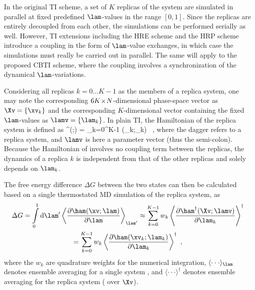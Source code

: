 In the original TI scheme\cite{KI33.1,KI34.2,KI35.1}, a set of 
$K$ replicas of the system are simulated in parallel at fixed predefined 
$\lam$-values in the range $[0,1]$.
Since the replicas are entirely decoupled 
from each other, the simulations
can be performed serially as well. However, TI extensions 
including the HRE scheme\cite{SU99.1,FU02.2,ZH16.2} and the HRP scheme\cite{IT13.1,IT13.2,YA17.2}
introduce a coupling in the form of $\lam$-value exchanges,
in which case the simulations must really be carried out in parallel.
The same will apply to the proposed CBTI scheme, where the coupling involves a synchronization of
the dynamical $\lam$-variations. 


Considering all replicas $k=0 \dots K-1$ as the members of a replica system,
one may note the corresponding $6K\mkern-3mu\times\mkern-3mu N$-dimensional phase-space vector
as $\Xv=\{\xv_k\}$ and the corresponding $K$-dimensional vector containing the fixed $\lam$-values as 
$\lamv=\{\lam_k\}$.
%
In plain TI, the Hamiltonian of the replica system is defined as
%
  \ham^\dagger(\Xv;\lamv) = \sum_{k=0}^{K-1} \ham(\xv_k;\lam_k) \ ,
\eeq
%
where the dagger refers to a replica system,
and $\lamv$ is here a parameter vector (thus the semi-colon).
Because the Hamiltonian of  involves no coupling 
term  between the replicas, the dynamics of a replica $k$
is independent from that of the other replicas and
solely depends on $\lam_k$.


The free energy difference $\Delta G$
between the two states can then be
calculated based on a single thermostated MD simulation 
of the replica system, as
%
\begin{multline}
  \label{eq:ti_formula}
  \Delta G = 
  \int\limits_0^1 \mathrm{d}\lam' \left\langle \frac{\partial{\ham(\xv;\lam)}}{\partial \lam} \right\rangle_{\lam'} 
    \approx
    \sum_{k=0}^{K-1}  w_k \left\langle \frac{\partial{\ham^\dagger(\Xv;\lamv)}}{\partial \lam_k} \right\rangle^\dagger\\ 
    = 
    \sum_{k=0}^{K-1}  w_k \left\langle \frac{\partial{\ham(\xv_k;\lam_k)}}{\partial \lam_k} \right\rangle^\dagger \ ,
\end{multline}
%
where 
the $w_k$ are quadrature weights for the numerical integration\cite{JO10.2,BR11.5,BR11.6},
$\langle\cdot\cdot\cdot\rangle_{\lam}$ denotes ensemble averaging 
for a single system ,
and
$\langle\cdot\cdot\cdot\rangle^\dagger$ denotes ensemble averaging 
for the replica system (\ie{} over $\Xv$).


